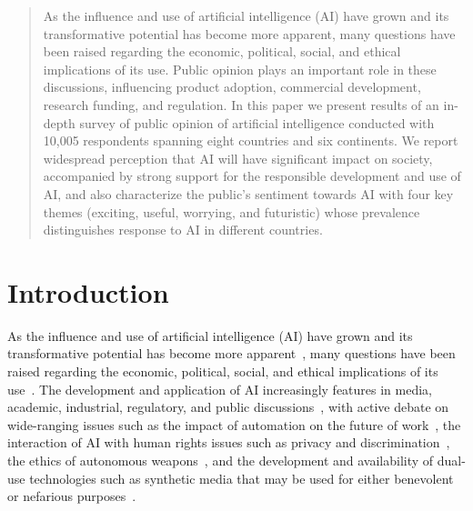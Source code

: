\documentclass[sigconf]{acmart}
\begin{document}
\begin{abstract}
As the influence and use of artificial intelligence (AI) have grown and its transformative potential has become more apparent, many questions have been raised regarding the economic, political, social, and ethical implications of its use. Public opinion plays an important role in these discussions, influencing product adoption, commercial development, research funding, and regulation. In this paper we present results of an in-depth survey of public opinion of artificial intelligence conducted with 10,005 respondents spanning eight countries and six continents. We report widespread perception that AI will have significant impact on society, accompanied by strong support for the responsible development and use of AI, and also characterize the public's sentiment towards AI with four key themes (exciting, useful, worrying, and futuristic) whose prevalence distinguishes response to AI in different countries.
\end{abstract}

\maketitle

\section{Introduction}
As the influence and use of artificial intelligence (AI) have grown and its transformative potential has become more apparent~\cite{horvitz2012interim, stone2016artificial}, many questions have been raised regarding the economic, political, social, and ethical implications of its use~\cite{hawking2014}. The development and application of AI increasingly features in media, academic, industrial, regulatory, and public discussions~\cite{dietterich2015rise, fast2017long, highlevel2019}, with active debate on wide-ranging issues such as the impact of automation on the future of work~\cite{brynjolfsson2014second, raghavan2020, sanchez-mondero2020}, the interaction of AI with human rights issues such as privacy and discrimination~\cite{abrassart2018, barabas2018, buolamwini2018, chancellor2019}, the ethics of autonomous weapons~\cite{scharre2018army, west2018}, and the development and availability of dual-use technologies such as synthetic media that may be used for either benevolent or nefarious purposes~\cite{openAI2019}.
\end{document}
